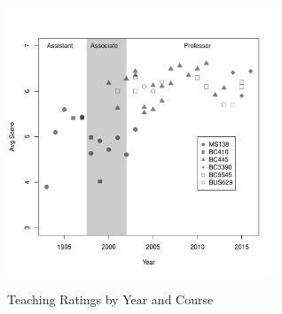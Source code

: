 \documentclass[11pt]{article}
\begin{document}
\begin{figure}[!h]
\begin{center}
\caption{Teaching Ratings by Year and Course}
\includegraphics[width=80mm]{data/teaching.pdf}
\label{default}
\end{center}
\end{figure}
\end{document}
